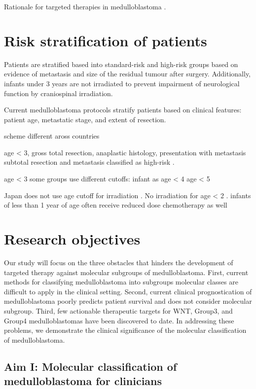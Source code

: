 Rationale for targeted therapies in medulloblastoma .


\section{Risk stratification of patients}

Patients are stratified based into standard-risk and high-risk groups based on evidence of metastasis and size of the residual tumour after surgery. Additionally, infants under 3 years are not irradiated to prevent impairment of neurological function by craniospinal irradiation.


Current medulloblastoma protocols stratify patients based on clinical features: patient age, metastatic stage, and extent of resection.

scheme different aross countries

age < 3, gross total resection, anaplastic histology, presentation with metastasis 
subtotal resection and metastasis classified as high-risk .

age < 3 
some groups use different cutoffs: infant as age < 4 
age < 5 

Japan does not use age cutoff for irradiation .
No irradiation for age < 2 .
infants of less than 1 year of age often receive reduced dose chemotherapy as well


\section{Research objectives}

Our study will focus on the three obstacles that hinders the development of targeted therapy against molecular subgroups of medulloblastoma. First, current methods for classifying medulloblastoma into subgroups molecular classes are difficult to apply in the clinical setting. Second, current clinical prognostication of medulloblastoma poorly predicts patient survival and does not consider molecular subgroup. Third, few actionable therapeutic targets for WNT, Group3, and Group4 medulloblastomas have been discovered to date. In addressing these problems, we demonstrate the clinical significance of the molecular classification of medulloblastoma.

\subsection*{Aim I: Molecular classification of medulloblastoma for clinicians}

